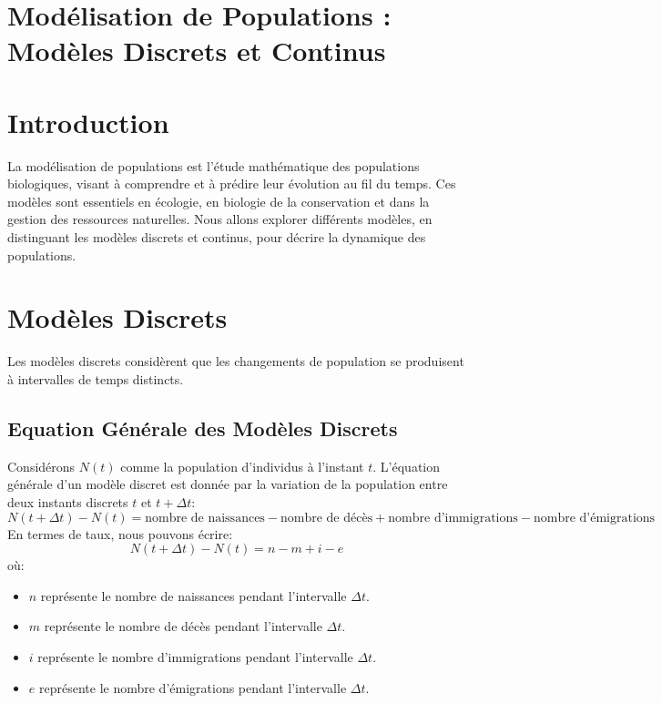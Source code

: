 \documentclass{article}
\begin{document}
\sloppy

\section{Modélisation de Populations : Modèles Discrets et Continus}

\section{Introduction}

La modélisation de populations est l'étude mathématique des populations biologiques, visant à comprendre et à prédire leur évolution au fil du temps. Ces modèles sont essentiels en écologie, en biologie de la conservation et dans la gestion des ressources naturelles. Nous allons explorer différents modèles, en distinguant les modèles discrets et continus, pour décrire la dynamique des populations.

\section{Modèles Discrets}

Les modèles discrets considèrent que les changements de population se produisent à intervalles de temps distincts.

\subsection{Equation Générale des Modèles Discrets}

Considérons $N(t)$ comme la population d'individus à l'instant $t$. L'équation générale d'un modèle discret est donnée par la variation de la population entre deux instants discrets $t$ et $t + \Delta t$:
\[
N(t + \Delta t) - N(t) = \text{nombre de naissances} - \text{nombre de décès} + \text{nombre d'immigrations} - \text{nombre d'émigrations}
\]
En termes de taux, nous pouvons écrire:
\[
N(t + \Delta t) - N(t) = n - m + i - e
\]
où:
\begin{itemize}
    \item $n$ représente le nombre de naissances pendant l'intervalle $\Delta t$.
    \item $m$ représente le nombre de décès pendant l'intervalle $\Delta t$.
    \item $i$ représente le nombre d'immigrations pendant l'intervalle $\Delta t$.
    \item $e$ représente le nombre d'émigrations pendant l'intervalle $\Delta t$.
\end{itemize}
\end{document}
